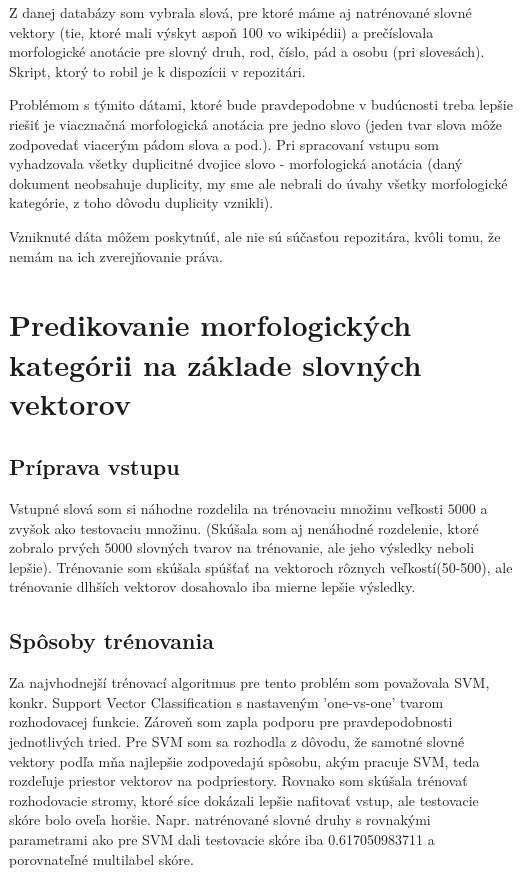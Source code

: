 \documentclass[12pt]{article}
\begin{document}
Z danej databázy som vybrala slová, pre ktoré máme aj natrénované slovné vektory (tie, ktoré mali výskyt aspoň 100 vo wikipédii) a prečíslovala morfologické anotácie pre slovný druh, rod, číslo, pád a osobu (pri slovesách). Skript, ktorý to robil je k dispozícii v repozitári.  

Problémom s týmito dátami, ktoré bude pravdepodobne v budúcnosti treba lepšie riešiť je viacznačná morfologická anotácia pre jedno slovo (jeden tvar slova môže zodpovedať viacerým pádom slova a pod.). Pri spracovaní vstupu som vyhadzovala všetky duplicitné dvojice slovo - morfologická anotácia (daný dokument neobsahuje duplicity, my sme ale nebrali do úvahy všetky morfologické kategórie, z toho dôvodu duplicity vznikli). 

Vzniknuté dáta môžem poskytnúť, ale nie sú súčasťou repozitára, kvôli tomu, že nemám na ich zverejňovanie práva. 

\section{Predikovanie morfologických kategórii na základe slovných vektorov}
\subsection{Príprava vstupu}
Vstupné slová som si náhodne rozdelila na trénovaciu množinu veľkosti $5000$ a zvyšok ako testovaciu množinu. (Skúšala som aj nenáhodné rozdelenie, ktoré zobralo prvých $5000$ slovných tvarov na trénovanie, ale jeho výsledky neboli lepšie). Trénovanie som skúšala spúšťať na vektoroch rôznych veľkostí(50-500), ale trénovanie dlhších vektorov dosahovalo iba mierne lepšie výsledky. 

\subsection{Spôsoby trénovania}
Za najvhodnejší trénovací algoritmus pre tento problém som považovala SVM, konkr. Support Vector Classification s nastaveným 'one-vs-one' tvarom rozhodovacej funkcie. Zároveň som zapla podporu pre pravdepodobnosti jednotlivých tried. Pre SVM som sa rozhodla z dôvodu, že samotné slovné vektory podľa mňa najlepšie zodpovedajú spôsobu, akým pracuje SVM, teda rozdeľuje priestor vektorov na podpriestory. Rovnako som skúšala trénovať rozhodovacie stromy, ktoré síce dokázali lepšie nafitovať vstup, ale testovacie skóre bolo oveľa horšie. Napr. natrénované slovné druhy s rovnakými parametrami ako pre SVM dali testovacie skóre iba 0.617050983711 a porovnateľné multilabel skóre. 
\end{document}
